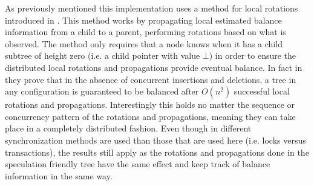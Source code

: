 As previously mentioned this implementation uses a method for local rotations introduced in \cite{IRISAppr}.
This method works by propagating local estimated balance information from a child to a parent,
performing rotations based on what is observed.
The method only requires that a node knows when it has a child subtree of height zero
(i.e. a child pointer with value $\bot$) in order to ensure
the distributed local rotations and propagations provide eventual balance.
In fact in \cite{IRISAppr} they prove that in the absence of concurrent insertions and deletions,
a tree in any configuration is guaranteed to be balanced after $O(n^2)$ successful local rotations
and propagations.
Interestingly this holds no matter the sequence or concurrency pattern of the rotations
and propagations, meaning they can take place in a completely distributed fashion.
Even though in \cite{IRISAppr} different synchronization methods are used than those that are used here
(i.e. locks versus transactions),
the results still apply as the rotations and
propagations done in the speculation friendly tree have the same effect and keep track of
balance information in the same way.


